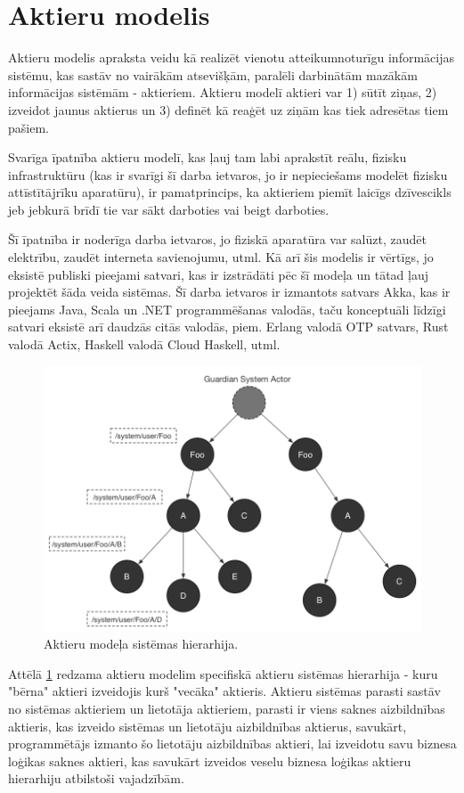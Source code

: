 \section{Aktieru modelis}

Aktieru modelis apraksta veidu kā realizēt vienotu atteikumnoturīgu informācijas
sistēmu, kas sastāv no vairākām atsevišķām, paralēli darbinātām mazākām
informācijas sistēmām - aktieriem. Aktieru modelī aktieri var 1) sūtīt ziņas, 2)
izveidot jaunus aktierus un 3) definēt kā reaģēt uz ziņām kas tiek adresētas
tiem pašiem. \cite[p. 1]{CarlHewitt2010}

Svarīga īpatnība aktieru modelī, kas ļauj tam labi aprakstīt reālu, fizisku
infrastruktūru (kas ir svarīgi šī darba ietvaros, jo ir nepieciešams modelēt
fizisku attīstītājrīku aparatūru), ir pamatprincips, ka aktieriem piemīt laicīgs
dzīvescikls jeb jebkurā brīdī tie var sākt darboties vai beigt darboties.
\cite[p. 6]{CarlHewitt2010} 
 
Šī īpatnība ir noderīga darba ietvaros, jo fiziskā aparatūra var salūzt, zaudēt
elektrību, zaudēt interneta savienojumu, utml. Kā arī šis modelis ir vērtīgs, jo
eksistē publiski pieejami satvari, kas ir izstrādāti pēc šī modeļa un tātad ļauj
projektēt šāda veida sistēmas. Šī darba ietvaros ir izmantots satvars Akka, kas
ir pieejams Java, Scala un .NET programmēšanas valodās, taču konceptuāli līdzīgi
satvari eksistē arī daudzās citās valodās, piem. Erlang valodā OTP satvars, Rust
valodā Actix, Haskell valodā Cloud Haskell, utml.

\begin{figure}[H]
    \includegraphics[width=0.5\linewidth]{assets/akka-actor-hierarchy-gray.png}
    \centering
    \caption{Aktieru modeļa sistēmas hierarhija. \cite[sl. 34]{MarkusJuraAkka}}
    \label{fig:actorsystem}
\end{figure}

Attēlā \ref{fig:actorsystem} redzama aktieru modelim specifiskā aktieru sistēmas
hierarhija - kuru "bērna" aktieri izveidojis kurš "vecāka" aktieris. Aktieru
sistēmas parasti sastāv no sistēmas aktieriem un lietotāja aktieriem, parasti ir
viens saknes aizbildnības aktieris, kas izveido sistēmas un lietotāju
aizbildnības aktierus, savukārt, programmētājs izmanto šo lietotāju aizbildnības
aktieri, lai izveidotu savu biznesa loģikas saknes aktieri, kas savukārt
izveidos veselu biznesa loģikas aktieru hierarhiju atbilstoši vajadzībām.
\cite[para. The Akka actor hierarchy]{LightbendAkka2619}

